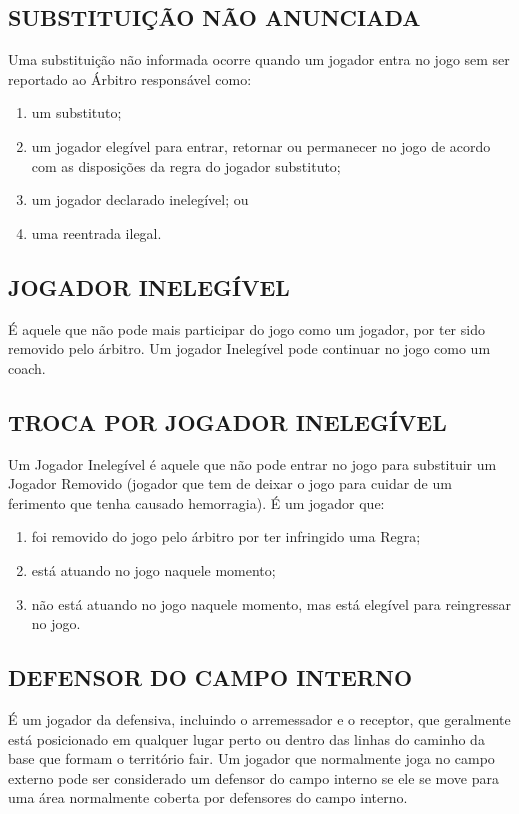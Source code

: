\subsection{SUBSTITUIÇÃO NÃO ANUNCIADA}
 Uma substituição não informada ocorre quando um jogador entra no jogo sem ser reportado ao Árbitro responsável como:
\begin{enumerate}[label=(\alph*)]\item   um substituto;
\item  um jogador elegível para entrar, retornar ou permanecer no jogo de
 acordo com as disposições da regra do jogador substituto;
\item  um jogador declarado inelegível; ou
\item  uma reentrada ilegal.
\end{enumerate}

\subsection{JOGADOR INELEGÍVEL}
 É aquele que não pode mais participar do jogo como um jogador, por ter sido removido pelo árbitro. Um jogador Inelegível pode continuar no jogo como um \gls{coach}.

\subsection{TROCA POR JOGADOR INELEGÍVEL}
 Um Jogador Inelegível é aquele que não pode entrar no jogo para substituir um Jogador Removido (jogador que tem de deixar o jogo para cuidar de um ferimento que tenha causado hemorragia). É um jogador que:

\begin{enumerate}[label=(\alph*)]\item   foi removido do jogo pelo árbitro por ter infringido uma Regra;
\item  está atuando no jogo naquele momento;
\item  não está atuando no jogo naquele momento, mas está elegível para reingressar no jogo.
\end{enumerate}

\subsection{DEFENSOR DO CAMPO INTERNO}

É um jogador da defensiva, incluindo o arremessador e o receptor, que geralmente está posicionado em qualquer lugar perto ou dentro das linhas do caminho da base que formam o território \gls{fair}. Um jogador que normalmente joga no campo externo pode ser considerado um defensor do campo interno se ele se move para uma área normalmente coberta por defensores do campo interno.


